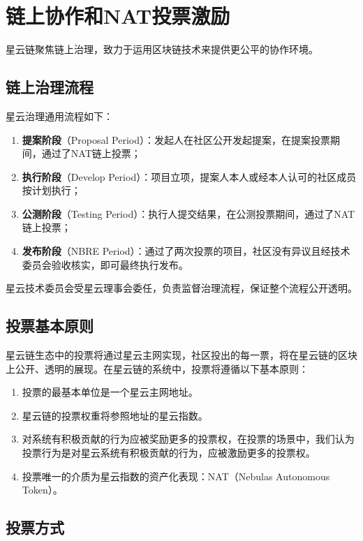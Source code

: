 \section{链上协作和NAT投票激励}

星云链聚焦链上治理，致力于运用区块链技术来提供更公平的协作环境。

\subsection{链上治理流程}

星云治理通用流程如下：

\begin{enumerate}
\item \textbf{提案阶段}（Proposal Period）：发起人在社区公开发起提案，在提案投票期间，通过了NAT链上投票；
\item \textbf{执行阶段}（Develop Period）：项目立项，提案人本人或经本人认可的社区成员按计划执行；
\item \textbf{公测阶段}（Testing Period）：执行人提交结果，在公测投票期间，通过了NAT链上投票；
\item \textbf{发布阶段}（NBRE Period）：通过了两次投票的项目，社区没有异议且经技术委员会验收核实，即可最终执行发布。
\end{enumerate}

星云技术委员会受星云理事会委任，负责监督治理流程，保证整个流程公开透明。


\subsection{投票基本原则}

星云链生态中的投票将通过星云主网实现，社区投出的每一票，将在星云链的区块上公开、透明的展现。在星云链的系统中，投票将遵循以下基本原则：

\begin{enumerate}
	\item 投票的最基本单位是一个星云主网地址。
	\item 星云链的投票权重将参照地址的星云指数。
	\item 对系统有积极贡献的行为应被奖励更多的投票权，在投票的场景中，我们认为投票行为是对星云系统有积极贡献的行为，应被激励更多的投票权。
	\item 投票唯一的介质为星云指数的资产化表现：NAT（Nebulas Autonomous Token）。
\end{enumerate}

\subsection{投票方式}

